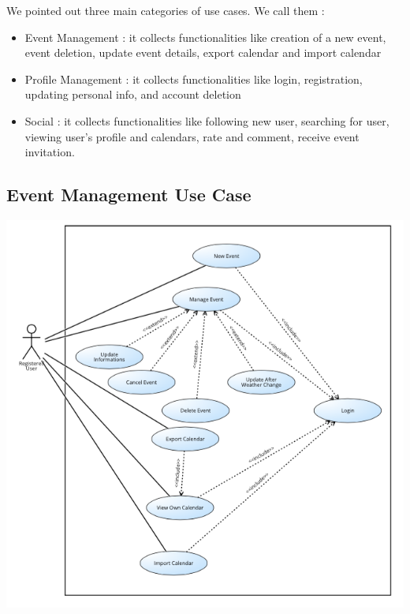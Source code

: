 \documentclass[12pt]{book}
\begin{document}
We pointed out three main categories of use cases. We call them : 
\begin{itemize}
	\item Event Management : it collects functionalities like creation of a new event, event deletion, update event details, export calendar and import calendar
	\item Profile Management : it collects functionalities like login, registration, updating personal info, and account deletion
	\item Social : it collects functionalities like following new user, searching for user, viewing user's profile and calendars, rate and comment, receive event invitation. 
\end{itemize}

\subsection{Event Management Use Case}
\begin{center}
\includegraphics[scale=0.8]{eventManagementUC}
\end{center}
\end{document}
